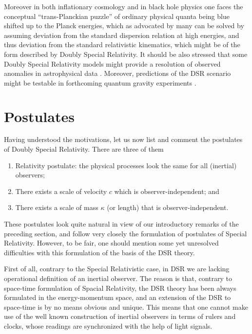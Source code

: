 \documentclass[a4paper,a4paper]{article}
\begin{document}
Moreover in both inflationary cosmology \cite{cosmo} and in black hole physics \cite{bh} one faces the conceptual ``trans-Planckian puzzle'' of ordinary physical quanta being blue shifted up to the Planck energies, which as advocated by many can be solved by assuming deviation from the standard dispersion relation at high energies, and thus deviation from the standard relativistic kinematics, which might be of the form described by Doubly Special Relativity. It should be also stressed that some Doubly Special Relativity models might provide a resolution of observed anomalies in astrophysical data \cite{astro}. Moreover, predictions of the DSR scenario might be testable in forthcoming quantum gravity experiments \cite{qg}.

\section{Postulates}

Having understood the motivations, let us now list and comment the postulates of Doubly Special Relativity. There are three of them

\begin{enumerate}
\item Relativity postulate: the physical processes look the same for all (inertial) observers;
\item There exists a scale of velocity $c$ which is observer-independent; and
\item There exists a scale of mass $\kappa$ (or length) that is observer-independent.
\end{enumerate}

These postulates look quite natural in view of our introductory remarks of the preceding section, and follow very closely the formulation of postulates of Special Relativity. However, to be fair, one should mention some yet unresolved difficulties with this formulation of the basis of the DSR theory.

First of all, contrary to the Special Relativistic case, in DSR we are lacking operational definition of an inertial observer. The reason is that, contrary to space-time formulation of Spacial Relativity, the DSR theory has been always formulated in the energy-momentum space, and an extension of the DSR to space-time is by no means obvious and unique. This means that one cannot make use of the well known construction of inertial observers in terms of rulers and clocks, whose readings are synchronized with the help of light signals.
\end{document}
